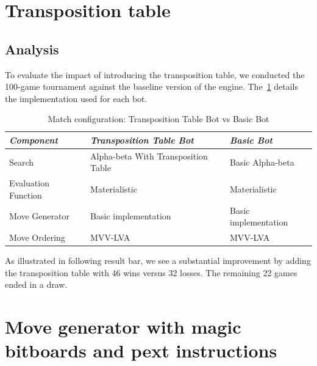 \section{Transposition table}\label{sec:tt}

\subsection*{Analysis}

\noindent To evaluate the impact of introducing the transposition table, we conducted the 100-game tournament against the baseline version of the engine. The~\cref{tab:tt_vs_basic} details the implementation used for each bot.

\vspace{1em}

\begin{table}
    \centering
    \begin{tabular}{|p{4cm}|p{4cm}|p{4cm}|}
    \hline
    \textit{Component}         & \textit{Transposition Table Bot}  & \textit{Basic Bot}     \\ \hline
    Search                     & Alpha-beta With Transposition Table          & Basic Alpha-beta           \\ \hline
    Evaluation Function        & Materialistic                      & Materialistic       \\ \hline
    Move Generator             & Basic implementation              & Basic implementation   \\ \hline
    Move Ordering              & MVV-LVA                           & MVV-LVA                \\ \hline
    \end{tabular}
    \caption{Match configuration: Transposition Table Bot vs Basic Bot}\label{tab:tt_vs_basic}
\end{table}

\noindent As illustrated in following result bar, we see a substantial improvement by adding the transposition table with 46 wins versus 32 losses. The remaining 22 games ended in a draw.

\begin{center}
\medskip
\end{center}

\section{Move generator with magic bitboards and pext instructions}

